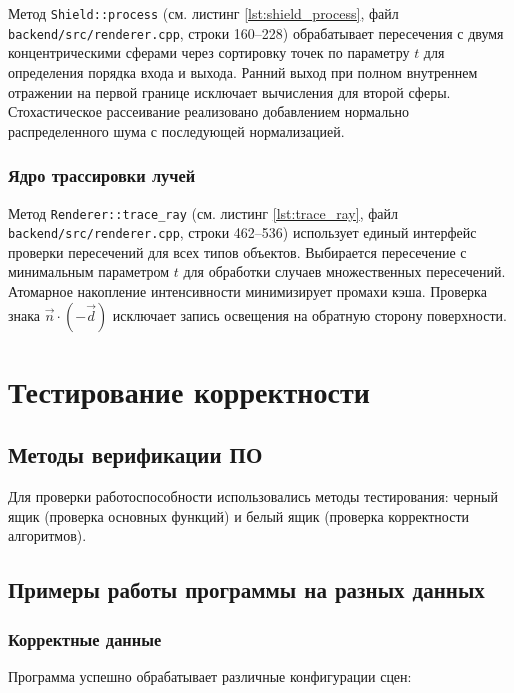 Метод \texttt{Shield::process} (см. листинг \ref{lst:shield_process}, файл \texttt{backend/src/renderer.cpp}, строки 160--228) обрабатывает пересечения с двумя концентрическими сферами через сортировку точек по параметру $t$ для определения порядка входа и выхода. Ранний выход при полном внутреннем отражении на первой границе исключает вычисления для второй сферы. Стохастическое рассеивание реализовано добавлением нормально распределенного шума с последующей нормализацией.

\subsubsection{Ядро трассировки лучей}

Метод \texttt{Renderer::trace\_ray} (см. листинг \ref{lst:trace_ray}, файл \texttt{backend/src/renderer.cpp}, строки 462--536) использует единый интерфейс проверки пересечений для всех типов объектов. Выбирается пересечение с минимальным параметром $t$ для обработки случаев множественных пересечений. Атомарное накопление интенсивности минимизирует промахи кэша. Проверка знака $\vec{n} \cdot (-\vec{d})$ исключает запись освещения на обратную сторону поверхности.

\section{Тестирование корректности}

\subsection{Методы верификации ПО}

Для проверки работоспособности использовались методы тестирования: черный ящик (проверка основных функций) и белый ящик (проверка корректности алгоритмов).

\subsection{Примеры работы программы на разных данных}

\subsubsection{Корректные данные}

Программа успешно обрабатывает различные конфигурации сцен:

